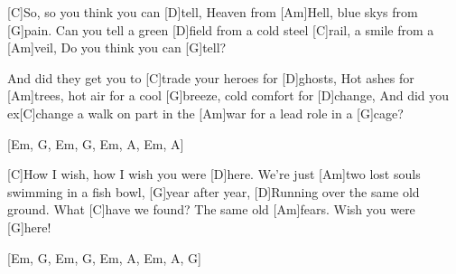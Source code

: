
[C]So, so you think you can [D]tell,
Heaven from [Am]Hell, blue skys from [G]pain.
Can you tell a green [D]field from a cold steel [C]rail, a smile from a [Am]veil,
Do you think you can [G]tell?

And did they get you to [C]trade your heroes for [D]ghosts,
Hot ashes for [Am]trees, hot air for a cool [G]breeze, cold comfort for [D]change, 
And did you ex[C]change a walk on part in the [Am]war 
for a lead role in a  [G]cage?

[Em, G, Em, G, Em, A, Em, A]

[C]How I wish, how I wish you were [D]here.
We're just [Am]two lost souls swimming in a fish bowl, [G]year after year,
[D]Running over the same old ground. What [C]have we found?
The same old [Am]fears. Wish you were [G]here!

[Em, G, Em, G, Em, A, Em, A, G]
